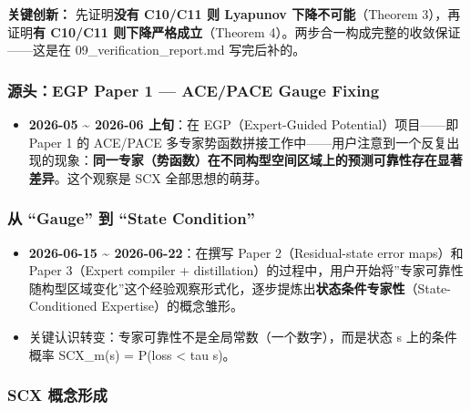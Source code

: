 \documentclass[
  12pt,
]{ctexart}
\providecommand{\tightlist}{%
  \setlength{\itemsep}{0pt}\setlength{\parskip}{0pt}}
\begin{document}
\textbf{关键创新：} 先证明\textbf{没有 C10/C11 则 Lyapunov
下降不可能}（Theorem 3），再证明\textbf{有 C10/C11
则下降严格成立}（Theorem 4）。两步合一构成完整的收敛保证------这是在
09\_verification\_report.md 写完后补的。

\subsubsection{源头：EGP Paper 1 --- ACE/PACE Gauge
Fixing}\label{ux6e90ux5934egp-paper-1-acepace-gauge-fixing}

\begin{itemize}
\tightlist
\item
  \textbf{2026-05 \textasciitilde{} 2026-06 上旬}：在 EGP（Expert-Guided
  Potential）项目------即 Paper 1 的 ACE/PACE
  多专家势函数拼接工作中------用户注意到一个反复出现的现象：\textbf{同一专家（势函数）在不同构型空间区域上的预测可靠性存在显著差异}。这个观察是
  SCX 全部思想的萌芽。
\end{itemize}

\subsubsection{从 ``Gauge'' 到 ``State
Condition''}\label{ux4ece-gauge-ux5230-state-condition}

\begin{itemize}
\tightlist
\item
  \textbf{2026-06-15 \textasciitilde{} 2026-06-22}：在撰写 Paper
  2（Residual-state error maps）和 Paper 3（Expert compiler +
  distillation）的过程中，用户开始将''专家可靠性随构型区域变化''这个经验观察形式化，逐步提炼出\textbf{状态条件专家性}（State-Conditioned
  Expertise）的概念雏形。
\item
  关键认识转变：专家可靠性不是全局常数（一个数字），而是状态 s
  上的条件概率 SCX\_m(s) = P(loss \textless{} tau \textbar{} s)。
\end{itemize}

\subsubsection{SCX 概念形成}\label{scx-ux6982ux5ff5ux5f62ux6210}
\end{document}
